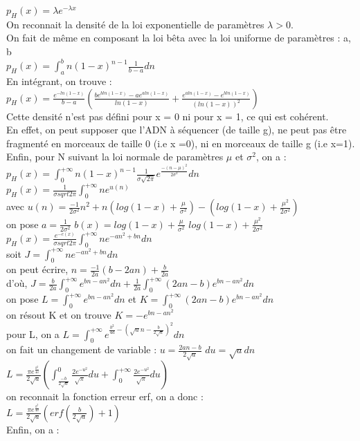 \documentclass[11pt,a4paper]{article} %
\begin{document}
$p_{H}(x) = \lambda e^{-\lambda x}$ \\

On reconnait la densité de la loi exponentielle de paramètres $\lambda > 0$. \\
On fait de même en composant la loi bêta avec la loi uniforme de paramètres : a, b \\
$p_{H}(x) = \int_{a}^{b}n(1-x)^{n-1}\frac{1}{b-a}dn$\\

En intégrant, on trouve : $ p_{H}(x)=\frac{e^{-ln(1-x)}}{b-a}(\frac{be^{bln(1-x)}-ae^{aln(1-x)}}{ln(1-x)}+ \frac{e^{aln(1-x)}-e^{bln(1-x)}}{(ln(1-x))^2})$\\

Cette densité n'est pas défini pour x = 0 ni pour x = 1, ce qui est cohérent. \\
En effet, on peut supposer que l'ADN à séquencer (de taille g), ne peut pas être fragmenté en morceaux de taille 0 (i.e x =0), ni en morceaux de taille g (i.e x=1). \\ 
Enfin, pour N suivant la loi normale de paramètres $\mu$ et $\sigma^2$, on a : \\
$p_{H}(x) = \int_{0}^{+\infty}n(1-x)^{n-1}\frac{1}{\sigma\sqrt{2\pi}}e^{\frac{-(n-\mu)^2}{2\sigma^2}}dn$ \\
$p_{H}(x)=\frac{1}{\sigma sqrt{2\pi}} \int_{0}^{+\infty}ne^{u(n)}$\\
avec $u(n)=\frac{-1}{2 \sigma^2}n^2+n(log(1-x)+\frac{\mu}{\sigma^2})-(log(1-x)+\frac{\mu^2}{2\sigma^2})$\\
on pose $a=\frac{1}{2\sigma^2}$ $b(x)=log(1-x)+\frac{\mu}{\sigma^2}$ $log(1-x)+\frac{\mu^2}{2\sigma^2}$\\
$p_{H}(x)=\frac{e^{-c(x)}}{\sigma sqrt{2\pi}} \int_{0}^{+\infty}ne^{-an^2+bn}dn$\\
soit $J = \int_{0}^{+\infty}ne^{-an^2+bn}dn $ \\
on peut écrire, $n=\frac{-1}{2a}(b-2an)+\frac{b}{2a}$\\
d'où, $J = \frac{b}{2a} \int_{0}^{+\infty}e^{bn-an^2}dn+\frac{1}{2a}\int_{0}^{+\infty}(2an-b)e^{bn-an^2}dn$\\
on pose $L = \int_{0}^{+\infty}e^{bn-an^2}dn$ et $K=\int_{0}^{+\infty}(2an-b)e^{bn-an^2}dn $\\
on résout K et on trouve $K = -e^{bn-an^2}$\\
pour L, on a $L=\int_{0}^{+\infty}e^{\frac{b^2}{4a}-(\sqrt{a}n-\frac{b}{2\sqrt{a}})^2}dn$\\
on fait un changement de variable : $u=\frac{2an-b}{2\sqrt{a}}$  $du = \sqrt{a}dn$\\
$L=\frac{\pi e^{\frac{b^2}{4a}}}{2\sqrt{a}}(\int_{\frac{-b}{2\sqrt{a}}}^{0}\frac{2e^{-u^2}}{\sqrt{\pi}}du+\int_{0}^{+\infty}\frac{2e^{-u^2}}{\sqrt{\pi}}du)$\\
on reconnait la fonction erreur erf, on a donc :\\
$L=\frac{\pi e^{\frac{b^2}{4a}}}{2\sqrt{a}} (erf(\frac{b}{2\sqrt{a}})+1)$\\
Enfin, on a : \\
\end{document}
